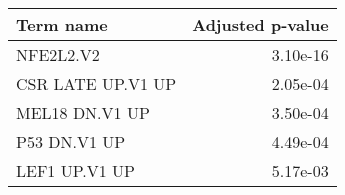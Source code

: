 \begin{tabular}{lr}
\toprule
        Term name &  Adjusted p-value \\
\midrule
        NFE2L2.V2 &          3.10e-16 \\
CSR LATE UP.V1 UP &          2.05e-04 \\
   MEL18 DN.V1 UP &          3.50e-04 \\
     P53 DN.V1 UP &          4.49e-04 \\
    LEF1 UP.V1 UP &          5.17e-03 \\
\bottomrule
\end{tabular}
